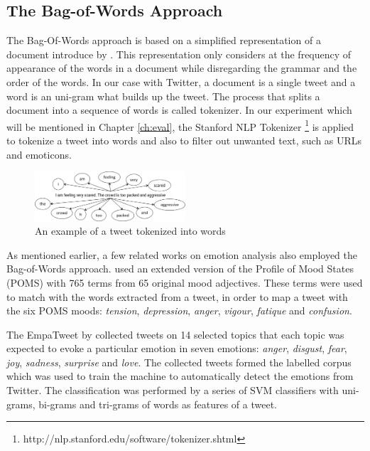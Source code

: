 \subsection{The Bag-of-Words Approach}
The Bag-Of-Words approach is based on a simplified representation of a document introduce by \citet{joachims1996probabilistic}. This representation only considers at the frequency of appearance of the words in a document while disregarding the grammar and the order of the words. In our case with Twitter, a document is a single tweet and a word is an uni-gram what builds up the tweet. The process that splits a document into a sequence of words is called tokenizer. In our experiment which will be mentioned in Chapter \ref{ch:eval}, the Stanford NLP Tokenizer \footnote{http://nlp.stanford.edu/software/tokenizer.shtml} is applied to tokenize a tweet into words and also to filter out unwanted text, such as URLs and emoticons. 

\begin{figure}[htb!] 
\centering    
\includegraphics[width=0.5\textwidth]{Tokenizer}
\caption{An example of a tweet tokenized into words}
\label{fig:tokenizer}
\end{figure}

As mentioned earlier, a few related works on emotion analysis also employed the Bag-of-Words approach. \citet{bollen2009modeling} used an extended version of the Profile of Mood States (POMS) with 765 terms from 65 original mood adjectives. These terms were used to match with the words extracted from a tweet, in order to map a tweet with the six POMS moods: \textit{tension}, \textit{depression}, \textit{anger}, \textit{vigour}, \textit{fatique} and \textit{confusion}.

The EmpaTweet by \citet{roberts2012empatweet} collected tweets on 14 selected topics that each topic was expected to evoke a particular emotion in seven emotions: \textit{anger}, \textit{disgust}, \textit{fear}, \textit{joy}, \textit{sadness}, \textit{surprise} and \textit{love}. The collected tweets formed the labelled corpus which was used to train the machine to automatically detect the emotions from Twitter. The classification was performed by a series of SVM classifiers with uni-grams, bi-grams and tri-grams of words as features of a tweet.

